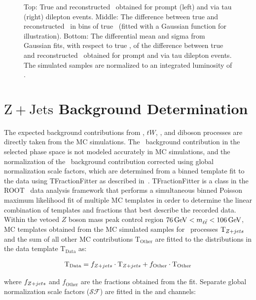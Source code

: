 \begin{figure}
\begin{center}
    \caption{\small Top: True and reconstructed \yt\ obtained for prompt (left) and via tau (right) \ttbar dilepton events.
    Middle: The difference between true and reconstructed \yt\ in bins of true \yt\ (fitted with a Gaussian function for illustration).
    Bottom: The differential mean and sigma from Gaussian fits, with respect to true \yt, of the difference between true and reconstructed \yt\ obtained for prompt and via tau \ttbar dilepton events.
    The simulated samples are normalized to an integrated luminosity of \lumivalueRuniiUL.}
    \label{fig:kinrec:resolution-yt}
 \end{center}
\end{figure}


\section{\ensuremath{\mathrm{Z+Jets}} Background Determination}
The expected background contributions from \ttbar, $tW$, \wjets, and diboson processes are directly taken from the MC simulations.
The \zjets\ background contribution in the selected phase space is not modeled accurately in MC simulations, and the normalization of the \zjets\ background contribution corrected using global normalization scale factors, which are determined from a binned template fit to the data using TFractionFitter as described in~\cite{CMS-PAS-TOP-20-006}\cite{BARLOW1993219}.
TFractionFitter is a class in the ROOT~\cite{Antcheva:2011zz} data analysis framework that performs a simultaneous binned Poisson maximum likelihood fit of multiple MC templates in order to determine the linear combination of templates and fractions that best describe the recorded data. 
Within the vetoed $Z$ boson mass peak control region $\SI{76}{\GeV} < \mll < \SI{106}{\GeV}$, MC templates obtained from the MC simulated samples for \zjets\ processes $\text{T}_{Z+jets}$ and the sum of all other MC contributions $\text{T}_\text{Other}$ are fitted to the \mll distributions in the data template $\text{T}_\text{Data}$ as:
\begin{linenomath*}
\begin{align}
\text{T}_\text{Data} = f_{Z+jets} \cdot \text{T}_{Z+jets} + f_{\text{Other}} \cdot \text{T}_\text{Other}
\end{align}
\end{linenomath*}
where $f_{Z+jets}$ and $f_{\text{Other}}$ are the fractions obtained from the fit.
Separate global normalization scale factors ($\mathcal{SF}$) are fitted in the \ee and \mumu channels:
